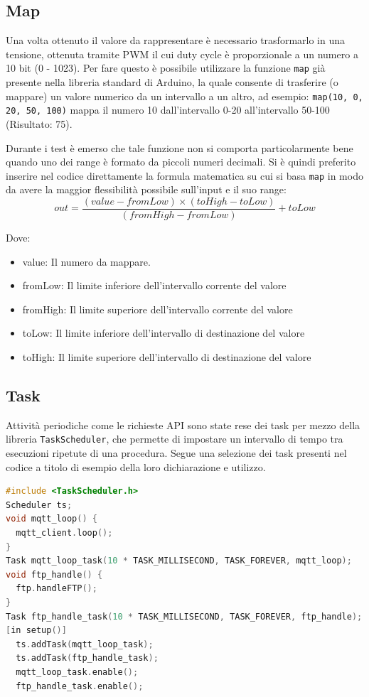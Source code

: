 \documentclass[12pt,a4paper]{report}
\begin{document}
\subsection{Map}
Una volta ottenuto il valore da rappresentare è necessario trasformarlo in una tensione, ottenuta tramite PWM il cui duty cycle è
proporzionale a un numero a 10 bit (0 - 1023). Per fare questo è possibile utilizzare la funzione \texttt{map} già presente nella
libreria standard di Arduino, la quale consente di trasferire (o mappare) un valore numerico da un intervallo a un altro, ad esempio:
\texttt{map(10, 0, 20, 50, 100)} mappa il numero 10 dall'intervallo 0-20 all'intervallo 50-100 (Risultato: 75).

Durante i test è emerso che tale funzione non si comporta particolarmente bene quando uno dei range è formato da piccoli numeri
decimali. Si è quindi preferito inserire nel codice direttamente la formula matematica su cui si basa \texttt{map} in modo da avere la
maggior flessibilità possibile sull'input e il suo range:
\[out = \frac{(value - fromLow) \times (toHigh - toLow)}{(fromHigh - fromLow)} + toLow \]

\noindent Dove:\cite{arduinomap}
\begin{itemize}
  \item value: Il numero da mappare.
  \item fromLow: Il limite inferiore dell'intervallo corrente del valore
  \item fromHigh: Il limite superiore dell'intervallo corrente del valore
  \item toLow: Il limite inferiore dell'intervallo di destinazione del valore
  \item toHigh: Il limite superiore dell'intervallo di destinazione del valore
\end{itemize}

\subsection{Task}
Attività periodiche come le richieste API sono state rese dei task per mezzo della libreria \texttt{TaskScheduler}, che permette di
impostare un intervallo di tempo tra esecuzioni ripetute di una procedura.
Segue una selezione dei task presenti nel codice a titolo di esempio della loro dichiarazione e utilizzo.
\begin{lstlisting}[language=cpp]
#include <TaskScheduler.h>
Scheduler ts;
void mqtt_loop() {
  mqtt_client.loop();
}
Task mqtt_loop_task(10 * TASK_MILLISECOND, TASK_FOREVER, mqtt_loop);
void ftp_handle() {
  ftp.handleFTP();
}
Task ftp_handle_task(10 * TASK_MILLISECOND, TASK_FOREVER, ftp_handle);
[in setup()]
  ts.addTask(mqtt_loop_task);
  ts.addTask(ftp_handle_task);
  mqtt_loop_task.enable();
  ftp_handle_task.enable();

\end{lstlisting}
\end{document}
